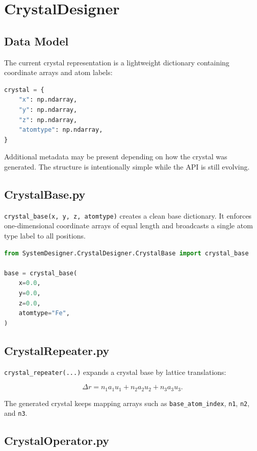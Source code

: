 \documentclass[11pt,a4paper]{article}
\begin{document}
\section{CrystalDesigner}

\subsection{Data Model}

The current crystal representation is a lightweight dictionary containing
coordinate arrays and atom labels:

\begin{lstlisting}[language=Python]
crystal = {
    "x": np.ndarray,
    "y": np.ndarray,
    "z": np.ndarray,
    "atomtype": np.ndarray,
}
\end{lstlisting}

Additional metadata may be present depending on how the crystal was generated.
The structure is intentionally simple while the API is still evolving.

\subsection{CrystalBase.py}

\texttt{crystal\_base(x, y, z, atomtype)} creates a clean base dictionary.
It enforces one-dimensional coordinate arrays of equal length and broadcasts a
single atom type label to all positions.

\begin{lstlisting}[language=Python]
from SystemDesigner.CrystalDesigner.CrystalBase import crystal_base

base = crystal_base(
    x=0.0,
    y=0.0,
    z=0.0,
    atomtype="Fe",
)
\end{lstlisting}

\subsection{CrystalRepeater.py}

\texttt{crystal\_repeater(...)} expands a crystal base by lattice translations:

\[
    \Delta r = n_1 a_1 u_1 + n_2 a_2 u_2 + n_3 a_3 u_3 .
\]

The generated crystal keeps mapping arrays such as
\texttt{base\_atom\_index}, \texttt{n1}, \texttt{n2}, and \texttt{n3}.

\subsection{CrystalOperator.py}
\end{document}
